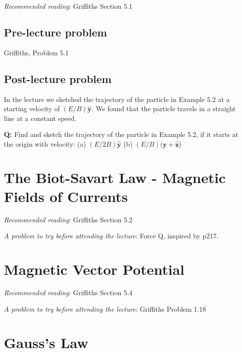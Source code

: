 \documentclass[
  letterpaper,
  DIV=11,
  numbers=noendperiod]{scrreprt}
\begin{document}
\emph{Recommended reading}: Griffiths Section 5.1

\section{Pre-lecture problem}\label{pre-lecture-problem-2}

Griffiths, Problem 5.1

\section{Post-lecture problem}\label{post-lecture-problem-3}

In the lecture we sketched the trajectory of the particle in Example 5.2
at a starting velocity of \((E/B) \hat{\mathrm{\mathbf{y}}}\). We found
that the particle travels in a straight line at a constant speed.

\textbf{Q:} Find and sketch the trajectory of the particle in Example
5.2, if it starts at the origin with velocity: (a)
\((E/2B) \hat{\mathrm{\mathbf{y}}}\) (b)
\((E/B) (\hat{\mathrm{\mathbf{y}}} + \hat{\mathrm{\mathbf{z}}}\))


\chapter{The Biot-Savart Law - Magnetic Fields of
Currents}\label{the-biot-savart-law---magnetic-fields-of-currents}

\emph{Recommended reading}: Griffiths Section 5.2

\emph{A problem to try before attending the lecture}: Force Q, inspired
by p217.


\chapter{Magnetic Vector Potential}\label{magnetic-vector-potential}

\emph{Recommended reading}: Griffiths Section 5.4

\emph{A problem to try before attending the lecture}: Griffiths Problem
1.18


\chapter{Gauss's Law}\label{gausss-law}
\end{document}
